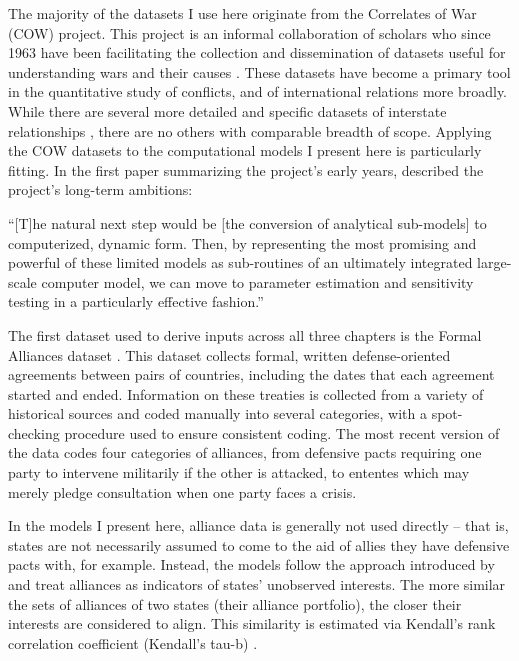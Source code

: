 The majority of the datasets I use here originate from the Correlates of War (COW) project. This project is an informal collaboration of scholars who since 1963 have been facilitating the collection and dissemination of datasets useful for understanding wars and their causes \citep{cow_2016}. These datasets have become a primary tool in the quantitative study of conflicts, and of international relations more broadly. While there are several more detailed and specific datasets of interstate relationships \citep[e.g.][]{hendrix_2013,raleigh_2010}, there are no others with comparable breadth of scope. Applying the COW datasets to the computational models I present here is particularly fitting. In the first paper summarizing the project's early years, \citet{singer_1972} described the project's long-term ambitions: 
\begin{displayquote}
``[T]he natural next step would be [the conversion of analytical sub-models] to computerized, dynamic form. Then, by representing the most promising and powerful of these limited models as sub-routines of an ultimately integrated large-scale computer model, we can move to parameter estimation and sensitivity testing in a particularly effective fashion.''
\end{displayquote}

The first dataset used to derive inputs across all three chapters is the Formal Alliances dataset \citep{singer_1969,gibler_2009}. This dataset collects formal, written defense-oriented agreements between pairs of countries, including the dates that each agreement started and ended. Information on these treaties is collected from a variety of historical sources \citep{gibler_2004} and coded manually into several categories, with a spot-checking procedure used to ensure consistent coding. The most recent version of the data codes four categories of alliances, from defensive pacts requiring one party to intervene militarily if the other is attacked, to ententes which may merely pledge consultation when one party faces a crisis. 

In the models I present here, alliance data is generally not used directly -- that is, states are not necessarily assumed to come to the aid of allies they have defensive pacts with, for example. Instead, the models follow the approach introduced by \citet{bdm_1975} and treat alliances as indicators of states' unobserved interests. The more similar the sets of alliances of two states (their alliance portfolio), the closer their interests are considered to align. This similarity is estimated via Kendall's rank correlation coefficient (Kendall's tau-b) \citep{abdi_2007}.

